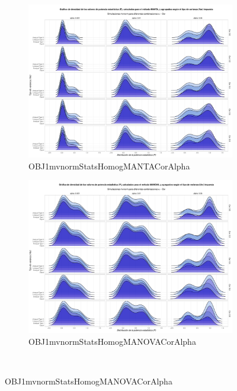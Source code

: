 \documentclass[IB,BIB]{TFUOC}%
\begin{document}
\begin{figure}
\centering
\begin{subfigure}{0.49\textwidth}
\centering
\includegraphics[width = \textwidth]{OBJ1mvnormStatsHomogMANTACorAlpha.pdf}
\caption{OBJ1mvnormStatsHomogMANTACorAlpha}
\label{figAppend:OBJ1mvnormStatsHomogMANTACorAlpha}
\end{subfigure}
\begin{subfigure}{0.49\textwidth}
\centering
\includegraphics[width = \textwidth]{OBJ1mvnormStatsHomogMANOVACorAlpha.pdf}
\caption{OBJ1mvnormStatsHomogMANOVACorAlpha}
\label{figAppend:OBJ1mvnormStatsHomogMANOVACorAlpha}
\end{subfigure}
\\

\end{figure}
\end{document}
